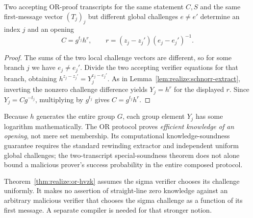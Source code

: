 \begin{theorem}\label{thm:realize:or-extract}
Two accepting OR-proof transcripts for
the same statement $C,S$ and the same first-message
vector $(T_j)_j$ but different global
challenges $e\ne e'$ determine an index $j$
and an opening
\[
 \boxed{C=g^{t_j}h^r,\qquad
 r=(z_j-z_j')(e_j-e_j')^{-1}.}
\]
\end{theorem}
\begin{proof}
The sums of the two local challenge vectors
are different, so for some branch $j$
we have $e_j\ne e_j'$.
Divide the two accepting verifier equations
for that branch, obtaining
$h^{z_j-z_j'}=Y_j^{e_j-e_j'}$.
As in Lemma~\ref{lem:realize:schnorr-extract},
inverting the nonzero challenge difference yields
$Y_j=h^r$ for the displayed $r$.
Since $Y_j=Cg^{-t_j}$, multiplying by $g^{t_j}$
gives $C=g^{t_j}h^r$.
\end{proof}

\begin{remark}
Because $h$ generates the entire group $G$,
each group element $Y_j$ has some logarithm
mathematically. The OR protocol proves
\emph{efficient knowledge of an opening},
not mere set membership. Its computational
knowledge-soundness guarantee requires
the standard rewinding extractor and
independent uniform global challenges;
the two-transcript special-soundness
theorem does not alone bound a malicious
prover's success probability in the
entire composed protocol.
\end{remark}

\begin{remark}
Theorem~\ref{thm:realize:or-hvzk} assumes the
sigma verifier chooses its challenge uniformly.
It makes no assertion of straight-line
zero knowledge against an arbitrary
malicious verifier that chooses the
sigma challenge as a function of its first
message. A separate compiler is needed for
that stronger notion.
\end{remark}
